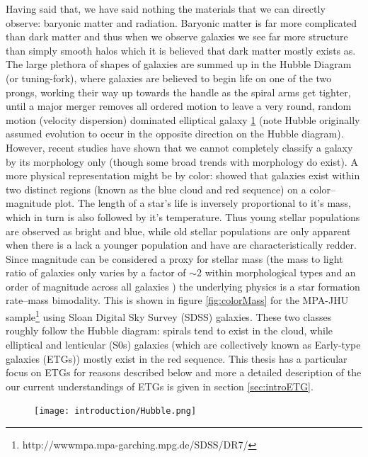 Having said that, we have said nothing the materials that we can directly observe: baryonic matter and radiation. Baryonic matter is far more complicated than dark matter and thus when we observe galaxies we see far more structure than simply smooth halos which it is believed that dark matter mostly exists as. The large plethora of shapes of galaxies are summed up in the Hubble Diagram (or tuning-fork), where galaxies are believed to begin life on one of the two prongs, working their way up towards the handle as the spiral arms get tighter, until a major merger removes all ordered motion to leave a very round, random motion (velocity dispersion) dominated elliptical galaxy \ref{fig:Hubble} (note Hubble originally assumed evolution to occur in the opposite direction on the Hubble diagram). However, recent studies have shown that we cannot completely classify a galaxy by its morphology only \citep{Cappellari2011, Sanchez2011, Arnold2013, Bryant2014} (though some broad trends with morphology do exist). A more physical representation might be by color: \citet{Baldry2004} showed that galaxies exist within two distinct regions (known as the blue cloud and red sequence) on a color--magnitude plot. The length of a star's life is inversely proportional to it's mass, which in turn is also followed by it's temperature. Thus young stellar populations are observed as bright and blue, while old stellar populations are only apparent when there is a lack a younger population and have are characteristically redder. Since magnitude can be considered a proxy for stellar mass (the mass to light ratio of galaxies only varies by a factor of $\sim$2 within morphological types and an order of magnitude across all galaxies \citep{Faber1979}) the underlying physics is a star formation rate--mass bimodality. This is shown in figure \ref{fig:colorMass} for the MPA-JHU sample\footnote{http://wwwmpa.mpa-garching.mpg.de/SDSS/DR7/} using Sloan Digital Sky Survey (SDSS) galaxies. These two classes roughly follow the Hubble diagram: spirals tend to exist in the cloud, while elliptical and lenticular (S0s) galaxies (which are collectively known as Early-type galaxies (ETGs)) mostly exist in the red sequence. This thesis has a particular focus on ETGs for reasons described below and more a detailed description of the our current understandings of ETGs is given in section \ref{sec:introETG}. 

\begin{figure}
	\centering
	\texttt{[image: introduction/Hubble.png]}
	\caption[The Hubble tuning-fork]{}
	\label{fig:Hubble}
\end{figure}

